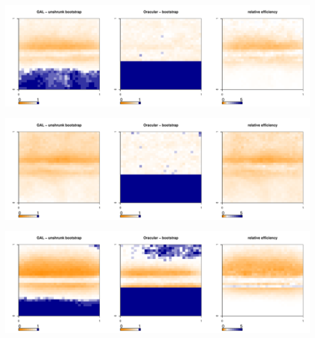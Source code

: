 \documentclass[authoryear, review, 11pt]{elsarticle}
\begin{document}
	\begin{center}
		\includegraphics[width=0.99\textwidth]{../../figures/X1-28-11.pdf}
		\label{fig:coveragemap11}
	\end{center}
	
	\begin{center}
		\includegraphics[width=0.99\textwidth]{../../figures/X1-28-12.pdf}
		\label{fig:coveragemap12}
	\end{center}
	
	\begin{center}
		\includegraphics[width=0.99\textwidth]{../../figures/X1-28-13.pdf}
		\label{fig:coveragemap13}
	\end{center}
        
\end{document}
